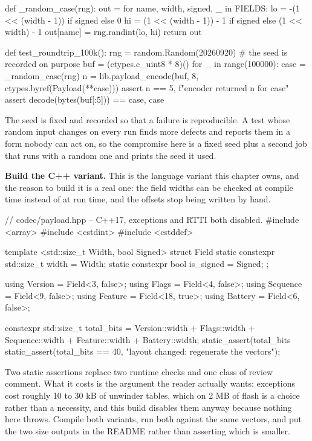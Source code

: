 \begin{steps}
\begin{pycode}
def _random_case(rng):
    out = {}
    for name, width, signed, _ in FIELDS:
        lo = -(1 << (width - 1)) if signed else 0
        hi = (1 << (width - 1)) - 1 if signed else (1 << width) - 1
        out[name] = rng.randint(lo, hi)
    return out

def test_roundtrip_100k():
    rng = random.Random(20260920)          # the seed is recorded on purpose
    buf = (ctypes.c_uint8 * 8)()
    for _ in range(100000):
        case = _random_case(rng)
        n = lib.payload_encode(buf, 8, ctypes.byref(Payload(**case)))
        assert n == 5, f"encoder returned {n} for {case}"
        assert decode(bytes(buf[:5])) == case, case
\end{pycode}
The seed is fixed and recorded so that a failure is reproducible. A test whose
random input changes on every run finds more defects and reports them in a form
nobody can act on, so the compromise here is a fixed seed plus a second job that
runs with a random one and prints the seed it used.

\item \textbf{Build the C++ variant.} This is the language variant this chapter
owns, and the reason to build it is a real one: the field widths can be checked
at compile time instead of at run time, and the offsets stop being written by
hand.
\begin{cppcode}
// codec/payload.hpp -- C++17, exceptions and RTTI both disabled.
#include <array>
#include <cstdint>
#include <cstddef>

template <std::size_t Width, bool Signed>
struct Field { static constexpr std::size_t width = Width;
               static constexpr bool is_signed = Signed; };

using Version  = Field<3,  false>;
using Flags    = Field<4,  false>;
using Sequence = Field<9,  false>;
using Feature  = Field<18, true>;
using Battery  = Field<6,  false>;

constexpr std::size_t total_bits =
    Version::width + Flags::width + Sequence::width
  + Feature::width + Battery::width;
static_assert(total_bits %
static_assert(total_bits == 40, "layout changed: regenerate the vectors");
\end{cppcode}
Two static assertions replace two runtime checks and one class of review
comment. What it costs is the argument the reader actually wants: exceptions
cost roughly 10 to 30 kB of unwinder tables, which on 2 MB of flash is a choice
rather than a necessity, and this build disables them anyway because nothing
here throws. Compile both variants, run both against the same vectors, and put
the two size outputs in the README rather than asserting which is smaller.


\end{steps}
